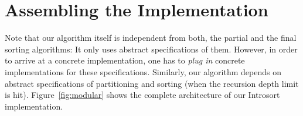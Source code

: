 \documentclass[sigplan,10pt,anonymous,review]{acmart}\settopmatter{printfolios=true,printccs=false,printacmref=false}
\theoremstyle{definition}
\begin{document}
\section{Assembling the Implementation}
  Note that our  algorithm itself is independent from both,
  the partial and the final sorting algorithms: It only uses
  abstract specifications of them.
  However, in order to arrive at a concrete implementation, one has
  to \emph{plug in} concrete implementations for these specifications.
  Similarly, our  algorithm depends on abstract
  specifications of partitioning and sorting (when the recursion depth limit is hit).
  Figure~\ref{fig:modular} shows the complete architecture of our Introsort implementation.
  \begin{figure}
  \begin{tikzpicture}[
    node distance=2mm,
    algoname/.style={font=\scriptsize\color{blue}\ttfamily},
    depname/.style={font=\fontsize{6}{6}\color{red}\ttfamily, anchor=west}
  ]
%
%
%
%
%


\end{tikzpicture}
\end{figure}
\end{document}
